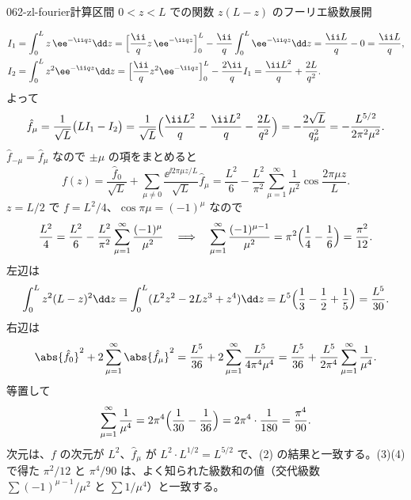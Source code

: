 \documentclass[uplatex,dvipdfmx,a4paper,11pt]{jsarticle}
\begin{document}
\begin{mondai}{062-zl-fourier}{計算}{区間 $0<z<L$ での関数 $z(L-z)$ のフーリエ級数展開}
\begin{tadashii}
\begin{align*}
I_1&=\int_{0}^{L}z\,\ee^{-\ii qz}\dd z=\Bigl[\frac{\ii}{q}z\,\ee^{-\ii qz}\Bigr]_{0}^{L}-\frac{\ii}{q}\int_{0}^{L}\ee^{-\ii qz}\dd z=\frac{\ii L}{q}-0=\frac{\ii L}{q},\\
I_2&=\int_{0}^{L}z^{2}\ee^{-\ii qz}\dd z=\Bigl[\frac{\ii}{q}z^{2}\ee^{-\ii qz}\Bigr]_{0}^{L}-\frac{2\ii}{q}I_1=\frac{\ii L^{2}}{q}+\frac{2L}{q^{2}}.
\end{align*}
よって
\[
\hat{f}_{\mu}=\frac{1}{\sqrt{L}}\bigl(LI_1-I_2\bigr)=\frac{1}{\sqrt{L}}\Bigl(\frac{\ii L^{2}}{q}-\frac{\ii L^{2}}{q}-\frac{2L}{q^{2}}\Bigr)=-\frac{2\sqrt{L}}{q_{\mu}^{2}}=-\frac{L^{5/2}}{2\pi^{2}\mu^{2}}.
\]
 $\hat{f}_{-\mu}=\hat{f}_{\mu}$ なので $\pm\mu$ の項をまとめると
\[
f(z)=\frac{\hat{f}_0}{\sqrt{L}}+\sum_{\mu\neq0}\frac{\ee^{\ii2\pi\mu z/L}}{\sqrt{L}}\hat{f}_{\mu}=\frac{L^{2}}{6}-\frac{L^{2}}{\pi^{2}}\sum_{\mu=1}^{\infty}\frac{1}{\mu^{2}}\cos\frac{2\pi\mu z}{L}.
\]
$z=L/2$ で $f=L^{2}/4$、$\cos\pi\mu=(-1)^{\mu}$ なので
\[
\frac{L^{2}}{4}=\frac{L^{2}}{6}-\frac{L^{2}}{\pi^{2}}\sum_{\mu=1}^{\infty}\frac{(-1)^{\mu}}{\mu^{2}}
\quad\Longrightarrow\quad
\sum_{\mu=1}^{\infty}\frac{(-1)^{\mu-1}}{\mu^{2}}=\pi^{2}\Bigl(\frac{1}{4}-\frac{1}{6}\Bigr)=\frac{\pi^{2}}{12}.
\]
 左辺は
\[
\int_{0}^{L}z^{2}(L-z)^{2}\dd z=\int_{0}^{L}(L^{2}z^{2}-2Lz^{3}+z^{4})\dd z=L^{5}\Bigl(\frac{1}{3}-\frac{1}{2}+\frac{1}{5}\Bigr)=\frac{L^{5}}{30}.
\]
右辺は
\[
\abs{\hat{f}_0}^{2}+2\sum_{\mu=1}^{\infty}\abs{\hat{f}_{\mu}}^{2}=\frac{L^{5}}{36}+2\sum_{\mu=1}^{\infty}\frac{L^{5}}{4\pi^{4}\mu^{4}}=\frac{L^{5}}{36}+\frac{L^{5}}{2\pi^{4}}\sum_{\mu=1}^{\infty}\frac{1}{\mu^{4}}.
\]
等置して
\[
\sum_{\mu=1}^{\infty}\frac{1}{\mu^{4}}=2\pi^{4}\Bigl(\frac{1}{30}-\frac{1}{36}\Bigr)=2\pi^{4}\cdot\frac{1}{180}=\frac{\pi^{4}}{90}.
\]
\kenzan 次元は、$f$ の次元が $L^{2}$、$\hat{f}_{\mu}$ が $L^{2}\cdot L^{1/2}=L^{5/2}$ で、(2) の結果と一致する。(3)(4) で得た $\pi^{2}/12$ と $\pi^{4}/90$ は、よく知られた級数和の値（交代級数 $\sum(-1)^{\mu-1}/\mu^{2}$ と $\sum1/\mu^{4}$）と一致する。
\end{tadashii}
\end{mondai}
\end{document}
